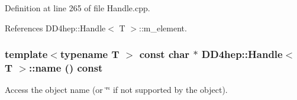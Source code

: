 Definition at line 265 of file Handle.cpp.

References DD4hep::Handle$<$ T $>$::m\_\-element.\hypertarget{class_d_d4hep_1_1_handle_a9c62b8d37e0f2354bae0093498dc15a1}{
\subsubsection[{name}]{\setlength{\rightskip}{0pt plus 5cm}template$<$typename T $>$ const char $\ast$ {\bf DD4hep::Handle}$<$ {\bf T} $>$::name () const}}
\label{class_d_d4hep_1_1_handle_a9c62b8d37e0f2354bae0093498dc15a1}


Access the object name (or \char`\"{}\char`\"{} if not supported by the object). 

